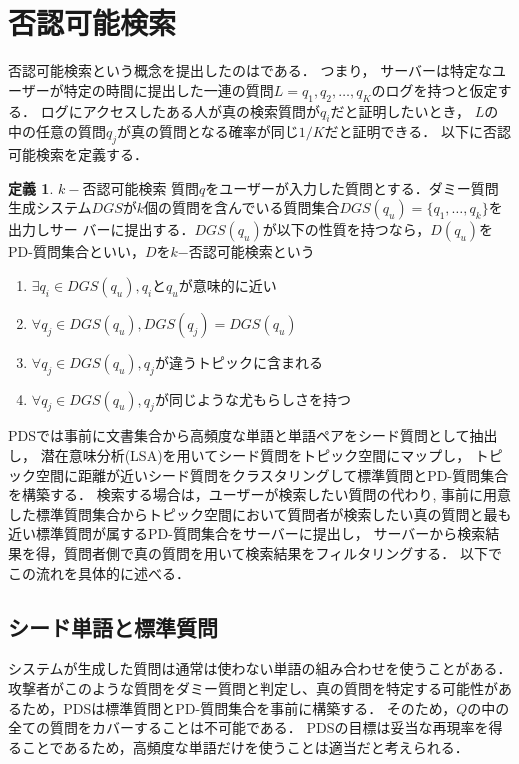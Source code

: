 \documentclass[master]{suribt}
\theoremstyle{definition}
\newtheorem{defi}[thm]{定義}
\begin{document}
 \section{否認可能検索}\label{s:PDS}
 否認可能検索という概念を提出したのは\cite{}である．
 つまり， サーバーは特定なユーザーが特定の時間に提出した一連の質問$L = {q_1, q_2, \dots , q_K}$のログを持つと仮定する． 
 ログにアクセスしたある人が真の検索質問が$q_i$だと証明したいとき， $L$の中の任意の質問$q_j$が真の質問となる確率が同じ$1/K$だと証明できる．
 以下に否認可能検索を定義する．
 \begin{defi}{$k−$否認可能検索}
 	質問$q$をユーザーが入力した質問とする．ダミー質問生成システム$DGS$が$k$個の質問を含んでいる質問集合$DGS(q_u)=\{q_1, \dots , q_k\}$を出力しサー
	バーに提出する．$DGS(q_u)$が以下の性質を持つなら，$D(q_u)$をPD-質問集合といい，$D$を$k$−否認可能検索という
	\begin{enumerate}
	\item $\exists q_i \in DGS(q_u),q_i$と$q_u$が意味的に近い
	\item $\forall q_j \in DGS(q_u),DGS(q_j) = DGS(q_u)$
	\item $\forall q_j \in DGS(q_u),q_j$が違うトピックに含まれる
	\item $\forall q_j \in DGS(q_u),q_j$が同じような尤もらしさを持つ
	\end{enumerate}
  \end{defi}
 PDSでは事前に文書集合から高頻度な単語と単語ペアをシード質問として抽出し，
 潜在意味分析(LSA)\cite{LSA1990}を用いてシード質問をトピック空間にマップし，
 トピック空間に距離が近いシード質問をクラスタリングして標準質問とPD-質問集合を構築する．
 検索する場合は，ユーザーが検索したい質問の代わり,
 事前に用意した標準質問集合からトピック空間において質問者が検索したい真の質問と最も近い標準質問が属するPD-質問集合をサーバーに提出し，
 サーバーから検索結果を得，質問者側で真の質問を用いて検索結果をフィルタリングする．
 以下でこの流れを具体的に述べる．
 \subsection{シード単語と標準質問}
 システムが生成した質問は通常は使わない単語の組み合わせを使うことがある．
 攻撃者がこのような質問をダミー質問と判定し、真の質問を特定する可能性があるため，PDSは標準質問とPD-質問集合を事前に構築する．
 そのため，$Q$の中の全ての質問をカバーすることは不可能である．
 PDSの目標は妥当な再現率を得ることであるため，高頻度な単語だけを使うことは適当だと考えられる．
 
\end{document}
